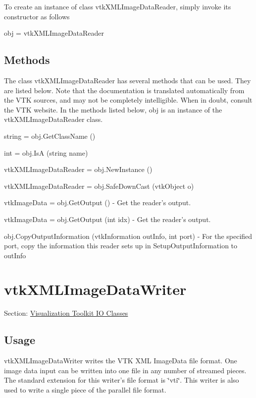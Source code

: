 To create an instance of class vtk\-X\-M\-L\-Image\-Data\-Reader, simply invoke its constructor as follows \begin{DoxyVerb}  obj = vtkXMLImageDataReader
\end{DoxyVerb}
 \hypertarget{vtkwidgets_vtkxyplotwidget_Methods}{}\subsection{Methods}\label{vtkwidgets_vtkxyplotwidget_Methods}
The class vtk\-X\-M\-L\-Image\-Data\-Reader has several methods that can be used. They are listed below. Note that the documentation is translated automatically from the V\-T\-K sources, and may not be completely intelligible. When in doubt, consult the V\-T\-K website. In the methods listed below, {\ttfamily obj} is an instance of the vtk\-X\-M\-L\-Image\-Data\-Reader class. 
\begin{DoxyItemize}
\item {\ttfamily string = obj.\-Get\-Class\-Name ()}  
\item {\ttfamily int = obj.\-Is\-A (string name)}  
\item {\ttfamily vtk\-X\-M\-L\-Image\-Data\-Reader = obj.\-New\-Instance ()}  
\item {\ttfamily vtk\-X\-M\-L\-Image\-Data\-Reader = obj.\-Safe\-Down\-Cast (vtk\-Object o)}  
\item {\ttfamily vtk\-Image\-Data = obj.\-Get\-Output ()} -\/ Get the reader's output.  
\item {\ttfamily vtk\-Image\-Data = obj.\-Get\-Output (int idx)} -\/ Get the reader's output.  
\item {\ttfamily obj.\-Copy\-Output\-Information (vtk\-Information out\-Info, int port)} -\/ For the specified port, copy the information this reader sets up in Setup\-Output\-Information to out\-Info  
\end{DoxyItemize}\hypertarget{vtkio_vtkxmlimagedatawriter}{}\section{vtk\-X\-M\-L\-Image\-Data\-Writer}\label{vtkio_vtkxmlimagedatawriter}
Section\-: \hyperlink{sec_vtkio}{Visualization Toolkit I\-O Classes} \hypertarget{vtkwidgets_vtkxyplotwidget_Usage}{}\subsection{Usage}\label{vtkwidgets_vtkxyplotwidget_Usage}
vtk\-X\-M\-L\-Image\-Data\-Writer writes the V\-T\-K X\-M\-L Image\-Data file format. One image data input can be written into one file in any number of streamed pieces. The standard extension for this writer's file format is \char`\"{}vti\char`\"{}. This writer is also used to write a single piece of the parallel file format.

